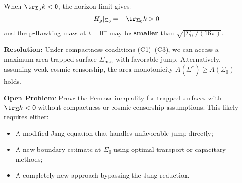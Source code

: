 \begin{remark}
When $\tr_{\Sigma_0} k < 0$, the horizon limit gives:
\begin{equation}
H_{\bar{g}}|_{\Sigma_0} = -\tr_{\Sigma_0} k > 0
\end{equation}
and the p-Hawking mass at $t = 0^+$ may be \textbf{smaller} than $\sqrt{|\Sigma_0|/(16\pi)}$.

\textbf{Resolution:} Under compactness conditions (C1)--(C3), we can access a maximum-area trapped surface $\Sigma_{\max}$ with favorable jump. Alternatively, assuming weak cosmic censorship, the area monotonicity $A(\Sigma^*) \geq A(\Sigma_0)$ holds.

\textbf{Open Problem:} Prove the Penrose inequality for trapped surfaces with $\tr_\Sigma k < 0$ without compactness or cosmic censorship assumptions. This likely requires either:
\begin{itemize}
\item A modified Jang equation that handles unfavorable jump directly;
\item A new boundary estimate at $\Sigma_0$ using optimal transport or capacitary methods;
\item A completely new approach bypassing the Jang reduction.
\end{itemize}
\end{remark}


